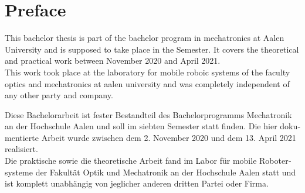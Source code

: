 \chapter*{Preface}
\label{preface}

This bachelor thesis is part of the bachelor program in mechatronics at Aalen University and is supposed to take place in the  Semester. It covers the theoretical and practical work between November  2020 and April  2021.\\

This work took place at the laboratory for mobile roboic systems of the faculty optics and mechatronics at aalen university and was completely independent of any other party and company.


\vspace*{25mm}

\begin{otherlanguage}{ngerman}
Diese Bachelorarbeit ist fester Bestandteil des Bachelorprogramms Mechatronik an der Hochschule Aalen und soll im siebten Semester statt finden. Die hier dokumentierte Arbeit wurde zwischen dem 2. November 2020 und dem 13. April 2021 realisiert.\\

Die praktische sowie die theoretische Arbeit fand im Labor für mobile Robotersysteme der Fakultät Optik und Mechatronik an der Hochschule Aalen statt und ist komplett unabhängig von jeglicher anderen dritten Partei oder Firma.
\end{otherlanguage}